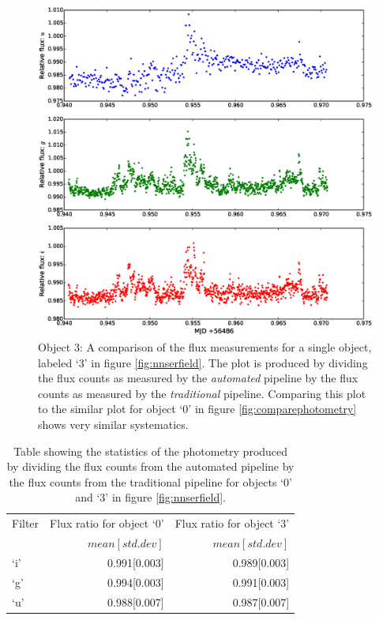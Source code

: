 \begin{figure}
\centering
\includegraphics[width=140mm]{images/compare_photometry_2.eps}
\caption{Object 3: A comparison of the flux measurements for a single object, labeled `3' in figure \ref{fig:nnserfield}. The plot is produced by dividing the flux counts as measured by the \emph{automated} pipeline by the flux counts as measured by the \emph{traditional} pipeline. Comparing this plot to the similar plot for object `0' in figure \ref{fig:comparephotometry} shows very similar systematics.}
\label{fig:comparephotometry2}
\end{figure}

\begin{table}
  \centering
  \begin{tabular}{l r r }
    \hline
    Filter & Flux ratio for object `0' & Flux ratio  for object `3'\\
           &  $mean[std. dev]$ &  $mean[std. dev]$\\
    \hline
    `i'    & 0.991[0.003]  & 0.989[0.003] \\
    `g'    & 0.994[0.003] & 0.991[0.003]\\
    `u'    & 0.988[0.007] & 0.987[0.007]\\
    \hline
   \end{tabular}
  \caption{Table showing the statistics of the photometry produced by dividing the flux counts from the automated pipeline by the flux counts from the traditional pipeline for objects `0'  and `3' in figure \ref{fig:nnserfield}.}
  \label{tab:differential}
\end{table}

